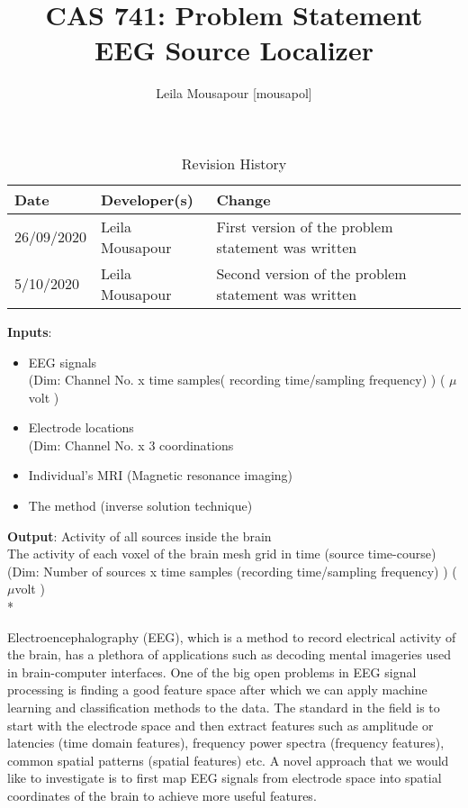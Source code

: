 \documentclass{article}
\title{CAS 741: Problem Statement\\EEG Source Localizer}
\author{Leila Mousapour [mousapol]}
\date{}
\begin{document}
\maketitle

\begin{table}[hp]
\caption{Revision History} \label{TblRevisionHistory}
\begin{tabularx}{\textwidth}{llX}
\toprule
\textbf{Date} & \textbf{Developer(s)} & \textbf{Change}\\
\midrule
26/09/2020 & Leila Mousapour & First version of the problem statement was written\\
5/10/2020 & Leila Mousapour & Second version of the problem statement was written\\
\bottomrule
\end{tabularx}
\end{table}

\textbf{Inputs}: 
\begin{itemize}
  \item EEG signals
  \\ {\footnotesize (Dim: Channel No. x time samples( recording time/sampling frequency) ) ( $\mu$volt )}
  \item Electrode locations
  \\ {\footnotesize (Dim: Channel No.  x 3 coordinations}
  \item Individual’s MRI (Magnetic resonance imaging)
  \item The method (inverse solution technique) 
\end{itemize}

\textbf{Output}: Activity of all sources inside the brain 
\\
{\footnotesize The activity of each voxel of the brain mesh grid in time (source time-course)
\\
(Dim: Number of sources x time samples (recording time/sampling frequency) ) ($\mu$volt )}
\\*

Electroencephalography (EEG), which is a method to record electrical activity of the brain, has a plethora of 
applications such as decoding mental imageries used in brain-computer interfaces. One of the big open problems 
in EEG signal processing is finding a good feature space after which we can apply machine learning and 
classification methods to the data. The standard in the field is to start with the electrode space and then extract 
features such as amplitude or latencies (time domain features), frequency power spectra (frequency features), 
common spatial patterns (spatial features) etc. A novel approach that we would like to investigate is to first map 
EEG signals from electrode space into spatial coordinates of the brain to achieve more useful features.
\\
\end{document}
